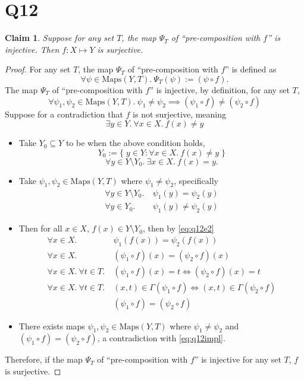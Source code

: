 \documentclass[12pt]{article}
\newtheorem*{claim}{Claim}
\begin{document}
\section*{Q12}
\begin{claim}
    Suppose for any set $T$, the map $\Psi_T$ of ``pre-composition with $f$'' is injective. Then
    $f:X\mapsto Y$ is surjective.
\end{claim}
\begin{proof}
    For any set $T$, the map $\Psi_T$ of ``pre-composition with $f$'' is defined as
    $$\forall \psi \in \text{Maps}(Y,T).~ \Psi_T(\psi) := (\psi \circ f).$$
    The map $\Psi_T$ of ``pre-composition with $f$'' is injective, by definition, for any set $T$,
    \begin{equation*} \tag{*} \label{eq:q12impl}
        \forall \psi_1,\psi_2 \in \text{Maps}(Y,T).~
        \psi_1 \not= \psi_2 \implies (\psi_1 \circ f) \not= (\psi_2 \circ f)
    \end{equation*}
    Suppose for a contradiction that $f$ is not surjective, meaning
    $$\exists y \in Y.~ \forall x \in X.~ f(x) \not = y$$
    \begin{itemize}[label={}]
        \item Take $Y_0 \subseteq Y$ to be when the above condition holds,
            $$Y_0 := \{\; y \in Y : \forall x \in X.~ f(x) \not = y\;\}$$
            $$\forall y \in Y\setminus Y_0.~ \exists x \in X.~ f(x) = y.$$
        \item Take $\psi_1, \psi_2 \in \text{Maps}(Y, T)$ where $\psi_1 \not= \psi_2$, specifically
            \begin{align}
                \forall y\in Y\setminus Y_0.~& \psi_1(y) = \psi_2(y) \tag{1} \label{eq:q12e2}\\
                \forall y \in Y_0.~& \psi_1(y) \not= \psi_2(y) \nonumber
            \end{align}
        \item Then for all $x \in X$, $f(x) \in Y \setminus Y_0$, then by \eqref{eq:q12e2}
            \begin{align*}
                \forall x \in X.~& \psi_1(f(x)) = \psi_2(f(x))\\
                \forall x \in X.~& (\psi_1 \circ f)(x) = (\psi_2 \circ f)(x)\\
                \forall x \in X.~ \forall t \in T.~& (\psi_1 \circ f)(x) = t \iff (\psi_2 \circ f)(x) = t\\
                \forall x \in X.~ \forall t \in T.~& (x,t) \in \Gamma(\psi_1 \circ f) \iff (x,t) \in \Gamma(\psi_2 \circ f)\\
                &(\psi_1 \circ f) = (\psi_2 \circ f)
            \end{align*}
        \item There exists maps $\psi_1, \psi_2 \in \text{Maps}(Y,T)$
            where $\psi_1 \not= \psi_2$ and $(\psi_1 \circ f) = (\psi_2 \circ f)$,
            a contradiction with \eqref{eq:q12impl}.
    \end{itemize}
    Therefore, if the map $\Psi_T$ of ``pre-composition with $f$'' is injective for any set $T$, $f$ is surjective.
\end{proof}
\end{document}
